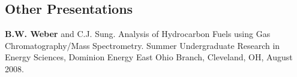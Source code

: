 \documentclass[margin,line]{res}
\newenvironment{list3}{
  \begin{list}{\ding{113}}{%
      \setlength{\itemsep}{0.1in}
      \setlength{\parsep}{0in} \setlength{\parskip}{0in}
      \setlength{\topsep}{0in} \setlength{\partopsep}{0in} 
      \setlength{\leftmargin}{0in}}}{\end{list}}
\begin{document}
\begin{resume}
\section{\sc Other Presentations}
\begin{list3}
\item[] {\bf B.W. Weber} and C.J. Sung. Analysis of Hydrocarbon Fuels using Gas Chromatography/Mass Spectrometry. Summer Undergraduate Research in Energy Sciences, Dominion Energy East Ohio Branch, Cleveland, OH, August 2008.
\end{list3}


\end{resume}
\end{document}
